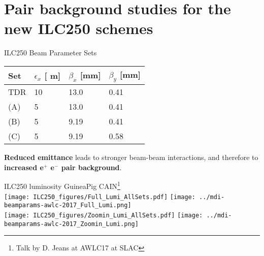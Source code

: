 \documentclass[xcolor={dvipsnames}]{beamer}
\newcommand{\electron}{e$^-$\xspace}
\newcommand{\positron}{e$^+$\xspace}
\newcommand{\murm}{%
  \ifmmode
    \mathchoice
        {\hbox{\normalsize\textmu}}
        {\hbox{\normalsize\textmu}}
        {\hbox{\scriptsize\textmu}}
        {\hbox{\tiny\textmu}}%
  \else
    \textmu
  \fi
}
\begin{document}
\section{Pair background studies for the new ILC250 schemes}

\begin{frame}{ILC250 Beam Parameter Sets}
 \begin{table}
\label{tab:Parameters}
\centering
\begin{tabularx}{0.55\textwidth}{llll}
\hline\hline
\textbf{Set}  & \textbf{$\epsilon_x$ [\murm m]} & \textbf{$\beta_x$ [mm]} & \textbf{$\beta_y$ [mm]}\\
\hline
\cline{1-4}
\hline
 TDR & 10 & 13.0 & 0.41\\
 (A) & 5 & 13.0 & 0.41\\
 (B) & 5 & 9.19 & 0.41\\
 (C) & 5 & 9.19 & 0.58\\
\hline\hline
\end{tabularx}
\end{table}
\vspace*{0.3cm}
\alert{\textbf{Reduced emittance} leads to stronger beam-beam interactions, and therefore to \textbf{increased \positron \electron pair background}.}
\end{frame}

\begin{frame}{ILC250 luminosity}
\small \hspace*{1.8cm} GuineaPig \hspace*{4cm} CAIN\footnote{\tiny Talk by D. Jeans at AWLC17 at SLAC}\\
\texttt{[image: ILC250\_figures/Full\_Lumi\_AllSets.pdf]}\hfil
\texttt{[image: ../mdi-beamparams-awlc-2017\_Full\_Lumi.png]}\\
\texttt{[image: ILC250\_figures/Zoomin\_Lumi\_AllSets.pdf]}\hfil
\texttt{[image: ../mdi-beamparams-awlc-2017\_Zoomin\_Lumi.png]}
\end{frame}
\end{document}
